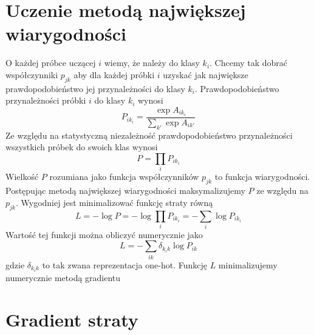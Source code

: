 \documentclass[10pt,a4paper]{article}
\begin{document}
\section{Uczenie metodą największej wiarygodności}

O każdej próbce uczącej $i$ wiemy, że należy do klasy $k_i$. Chcemy tak dobrać współczynniki $p_{jk}$ aby dla każdej próbki $i$ uzyskać jak największe prawdopodobieństwo jej przynależności do klasy $k_i$. Prawdopodobieństwo przynależności próbki $i$ do klasy $k_i$ wynosi
\begin{displaymath}
P_{ik_i}=\frac{\exp A_{ik_i}}{\sum_{k'}\exp A_{ik'}}
\end{displaymath}
Ze względu na statystyczną niezależność prawdopodobieństwo przynależności wszystkich próbek do swoich klas wynosi
\begin{displaymath}
P=\prod_iP_{ik_i}
\end{displaymath}
Wielkość $P$ rozumiana jako funkcja współczynników $p_{jk}$ to funkcja wiarygodności. Postępując metodą największej wiarygodności maksymalizujemy $P$ ze względu na $p_{jk}$. Wygodniej jest minimalizować funkcję straty równą
\begin{displaymath}
L=-\log P=-\log\prod_iP_{ik_i}=-\sum_i\log P_{ik_i}
\end{displaymath}
Wartość tej funkcji można obliczyć numerycznie jako
\begin{displaymath}
L=-\sum_{ik}\delta_{k_ik}\log P_{ik}
\end{displaymath}
gdzie $\delta_{k_ik}$ to tak zwana reprezentacja one-hot. Funkcję $L$ minimalizujemy numerycznie metodą gradientu

\section{Gradient straty}
\end{document}
